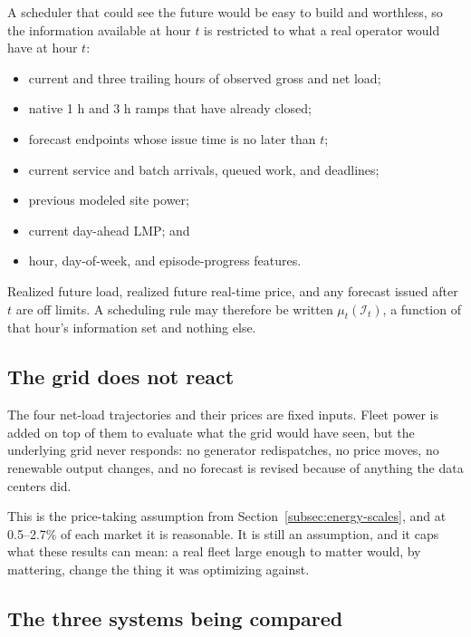 ﻿\documentclass[12pt]{article}
\begin{document}
A scheduler that could see the future would be easy to build and worthless, so
the information available at hour \(t\) is restricted to what a real operator
would have at hour \(t\):
\begin{itemize}
  \item current and three trailing hours of observed gross and net load;
  \item native 1 h and 3 h ramps that have already closed;
  \item forecast endpoints whose issue time is no later than \(t\);
  \item current service and batch arrivals, queued work, and deadlines;
  \item previous modeled site power;
  \item current day-ahead LMP; and
  \item hour, day-of-week, and episode-progress features.
\end{itemize}

Realized future load, realized future real-time price, and any forecast issued
after \(t\) are off limits. A scheduling rule may therefore be written
\(\mu_t(\mathcal{I}_t)\), a function of that hour's information set and nothing
else.

\subsection{The grid does not react}
\label{subsec:problem-grid-boundary}

The four net-load trajectories and their prices are fixed inputs. Fleet power is
added on top of them to evaluate what the grid would have seen, but the
underlying grid never responds: no generator redispatches, no price moves, no
renewable output changes, and no forecast is revised because of anything the
data centers did.

This is the price-taking assumption from
Section~\ref{subsec:energy-scales}, and at 0.5--2.7\% of each market it is
reasonable. It is still an assumption, and it caps what these results can mean:
a real fleet large enough to matter would, by mattering, change the thing it was
optimizing against.

\subsection{The three systems being compared}
\label{subsec:problem-baselines}
\end{document}
